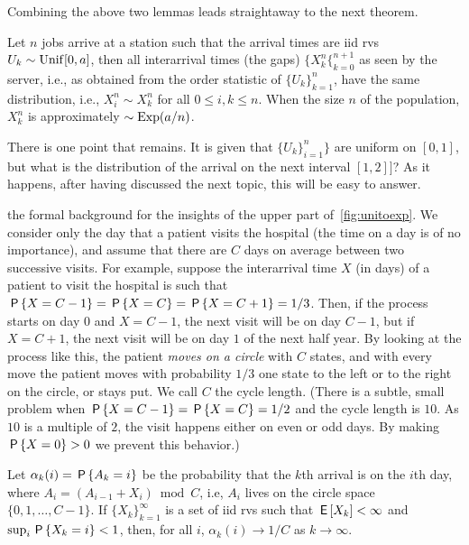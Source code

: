 \documentclass[queueing-book.tex]{subfiles}
\begin{document}
Combining the above two lemmas leads straightaway to the next theorem.
\begin{theorem}
Let $n$ jobs arrive at a station such that the arrival times are iid rvs $U_{k}\sim \Unif{[0,a]}$, then all interarrival times (the gaps) $\{X_{k}^{n}\{_{k=0}^{n+1}$ as seen by the server, i.e., as obtained from the order statistic of $\{U_{k}\}_{k=1}^{n}$, have the same distribution, i.e., $X_i^n \sim X_k^{n}$ for all $0\leq i,k \leq n$.
When the size $n$ of the population, $X_k^{n}$ is approximately $\sim \Exp{a/n}$.
\end{theorem}

There is one point that remains.
It is given that $\{U_{k}\}_{i=1}^{n}\}$ are uniform on $[0,1]$, but what is the distribution of the arrival on the next interval $[1,2]]$?
As it happens, after having discussed the next topic, this will be easy to answer.


 the formal background for the insights of the upper part of~\cref{fig:unitoexp}.
We consider only the day that a patient visits the hospital (the time on a day is of no importance), and assume that there are $C$ days on average between two successive visits.
For example, suppose the interarrival time $X$ (in days) of a patient to visit the hospital is such that $\P{X=C-1} = \P{X=C} = \P{X=C+1}=1/3$.
Then, if the process starts on day $0$ and $X = C-1$, the next visit will be on day $C-1$, but if $X=C+1$, the next visit will be on day $1$ of the next half year.
By looking at the process like this, the patient \emph{moves on a circle} with $C$ states, and with every move the patient moves with probability $1/3$ one state to the left or to the right on the circle, or stays put. We call $C$ the cycle length.
(There is a subtle, small problem when $\P{X=C-1} = \P{X=C} = 1/2$ and the cycle length is $10$.
As $10$ is a multiple of $2$, the visit happens either on even or odd days.
By making $\P{X = 0} > 0$ we prevent this behavior.)

\begin{theorem}\label{thr:2}
Let $\alpha_k(i) = \P{A_k=i}$ be the probability that the $k$th arrival is on the $i$th day, where $A_{i} = (A_{i-1} + X_{i}) \bmod C$, i.e, $A_{i}$ lives on the circle space $\{0, 1, \ldots, C-1\}$.
If $\{X_{k}\}_{k=1}^{\infty}$ is a set of iid rvs such that $\E{X_{k}} < \infty$ and $\sup_{i}\P{X_{k} =i} < 1$, then, for all $i$, $\alpha_k(i) \to 1/C$ as $k\to\infty$.
\end{theorem}
\end{document}
